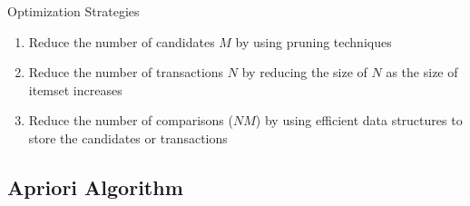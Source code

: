 \begin{concept}{Optimization Strategies}
\begin{enumerate}
    \item Reduce the number of candidates $M$ by using pruning techniques
    \item Reduce the number of transactions $N$ by reducing the size of $N$ as the size of itemset increases
    \item Reduce the number of comparisons ($NM$) by using efficient data structures to store the candidates or transactions
\end{enumerate}
\end{concept}

\subsection{Apriori Algorithm}


